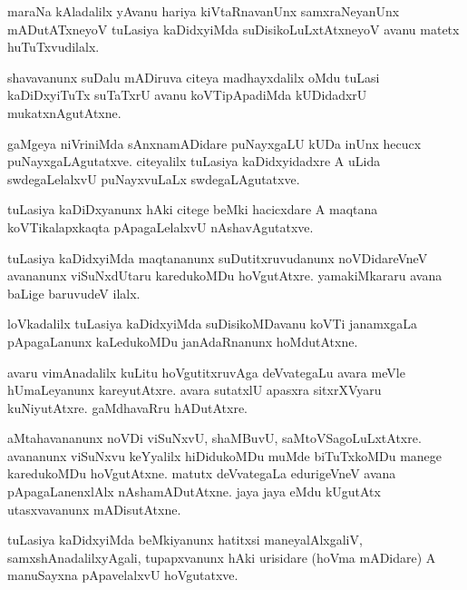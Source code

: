 \documentclass{article}
\begin{document}
\begin{mn}%
maraNa kAladalilx yAvanu hariya kiVtaRnavanUnx samxraNeyanUnx mADutATxneyoV tuLasiya 
kaDidxyiMda suDisikoLuLxtAtxneyoV avanu matetx huTuTxvudilalx.
\end{mn}

\begin{mn}%
shavavanunx suDalu mADiruva citeya madhayxdalilx oMdu tuLasi kaDiDxyiTuTx suTaTxrU avanu 
koVTipApadiMda kUDidadxrU mukatxnAgutAtxne.
\end{mn}

\begin{mn}%
gaMgeya niVriniMda sAnxnamADidare puNayxgaLU kUDa inUnx hecucx puNayxgaLAgutatxve. 
citeyalilx tuLasiya kaDidxyidadxre A uLida swdegaLelalxvU puNayxvuLaLx swdegaLAgutatxve.
\end{mn}

\begin{mn}%
tuLasiya kaDiDxyanunx hAki citege beMki hacicxdare A maqtana koVTikalapxkaqta pApagaLelalxvU 
nAshavAgutatxve.
\end{mn}

\begin{mn}%
tuLasiya kaDidxyiMda maqtananunx suDutitxruvudanunx noVDidareVneV avananunx viSuNxdUtaru 
karedukoMDu hoVgutAtxre. yamakiMkararu avana baLige baruvudeV ilalx.
\end{mn}

\begin{mn}%
loVkadalilx tuLasiya kaDidxyiMda suDisikoMDavanu koVTi janamxgaLa pApagaLanunx kaLedukoMDu 
janAdaRnanunx hoMdutAtxne.
\end{mn}

\begin{mn}%
avaru vimAnadalilx kuLitu hoVgutitxruvAga deVvategaLu avara meVle hUmaLeyanunx kareyutAtxre. 
avara sutatxlU apasxra sitxrXVyaru kuNiyutAtxre. gaMdhavaRru hADutAtxre.
\end{mn}

\begin{mn}%
aMtahavananunx noVDi viSuNxvU, shaMBuvU, saMtoVSagoLuLxtAtxre. avananunx viSuNxvu keYyalilx 
hiDidukoMDu muMde biTuTxkoMDu manege karedukoMDu hoVgutAtxne. matutx deVvategaLa 
edurigeVneV avana pApagaLanenxlAlx nAshamADutAtxne. jaya jaya eMdu kUgutAtx utasxvavanunx 
mADisutAtxne.
\end{mn}

\begin{mn}%
tuLasiya kaDidxyiMda beMkiyanunx hatitxsi maneyalAlxgaliV, samxshAnadalilxyAgali, 
tupapxvanunx hAki urisidare (hoVma mADidare) A manuSayxna pApavelalxvU hoVgutatxve.
\end{mn}
\end{document}
